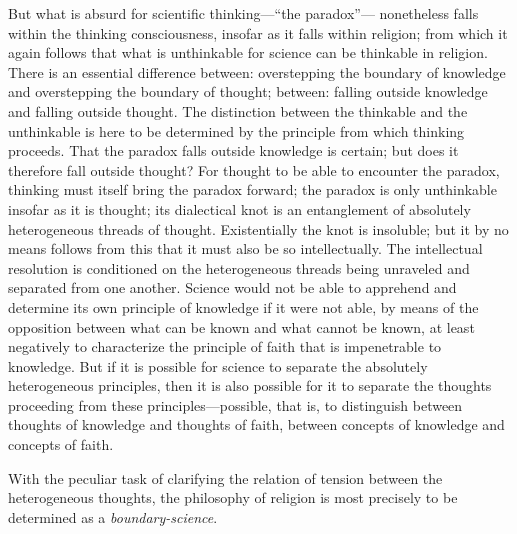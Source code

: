 \documentclass[12pt,a4paper]{article}
\begin{document}
But what is absurd for scientific thinking---``the paradox''---
nonetheless falls within the thinking consciousness, insofar as
it falls within religion; from which it again follows that what
is unthinkable for science can be thinkable in religion. There
is an essential difference between: overstepping the boundary of
knowledge and overstepping the boundary of thought; between:
falling outside knowledge and falling outside thought. The
distinction between the thinkable and the unthinkable is here to
be determined by the principle from which thinking proceeds.
That the paradox falls outside knowledge is certain; but does it
therefore fall outside thought? For thought to be able to
encounter the paradox, thinking must itself bring the paradox
forward; the paradox is only unthinkable insofar as it is
thought; its dialectical knot is an entanglement of absolutely
heterogeneous threads of thought. Existentially the knot is
insoluble; but it by no means follows from this that it must
also be so intellectually. The intellectual resolution is
conditioned on the heterogeneous threads being unraveled and
separated from one another. Science would not be able to
apprehend and determine its own principle of knowledge if it
were not able, by means of the opposition between what can be
known and what cannot be known, at least negatively to
characterize the principle of faith that is impenetrable to
knowledge. But if it is possible for science to separate the
absolutely heterogeneous principles, then it is also possible
for it to separate the thoughts proceeding from these
principles---possible, that is, to distinguish between thoughts
of knowledge and thoughts of faith, between concepts of
knowledge and concepts of faith.

With the peculiar task of clarifying the relation of tension
between the heterogeneous thoughts, the philosophy of religion
is most precisely to be determined as a \emph{boundary-science}.
\end{document}

